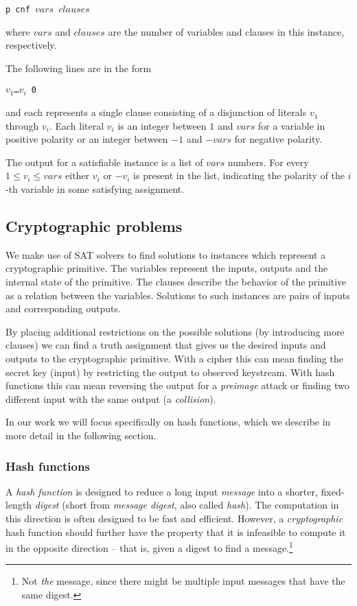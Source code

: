 \centerline{\texttt{p cnf $vars$ $clauses$}}

\noindent where $vars$ and $clauses$ are the number of variables and clauses in this instance, respectively.

The following lines are in the form

\centerline{\texttt{$v_1$\dots$v_i$ 0}}

\noindent and each represents a single clause consisting of a disjunction of literals $v_1$ through $v_i$.
Each literal $v_i$ is an integer between $1$ and $vars$ for a variable in positive polarity or an integer between $-1$ and $-vars$ for negative polarity.

The output for a satisfiable instance is a list of $vars$ numbers.
For every $1 \le v_i \le vars$ either $v_i$ or $-v_i$ is present in the list, indicating the polarity of the $i$-th variable in some satisfying assignment. 

\subsection{Cryptographic problems}
We make use of SAT solvers to find solutions to instances which represent a cryptographic primitive.
The variables represent the inputs, outputs and the internal state of the primitive.
The clauses describe the behavior of the primitive as a relation between the variables.
Solutions to such instances are pairs of inputs and corresponding outputs.

By placing additional restrictions on the possible solutions (by introducing more clauses) we can find a truth assignment that gives us the desired inputs and outputs to the cryptographic primitive.
With a cipher this can mean finding the secret key (input) by restricting the output to observed keystream.
With hash functions this can mean reversing the output for a \emph{preimage} attack or finding two different input with the same output (a \emph{collision}).

In our work we will focus specifically on hash functions, which we describe in more detail in the following section.

\subsubsection{Hash functions}
A \emph{hash function} is designed to reduce a long input \emph{message} into a shorter, fixed-length \emph{digest} (short from \emph{message digest}, also called \emph{hash}).
The computation in this direction is often designed to be fast and efficient.
However, a \emph{cryptographic} hash function should further have the property that it is infeasible to compute it in the opposite direction -- that is, given a digest to find a message.\footnote{Not \emph{the} message, since there might be multiple input messages that have the same digest.}

